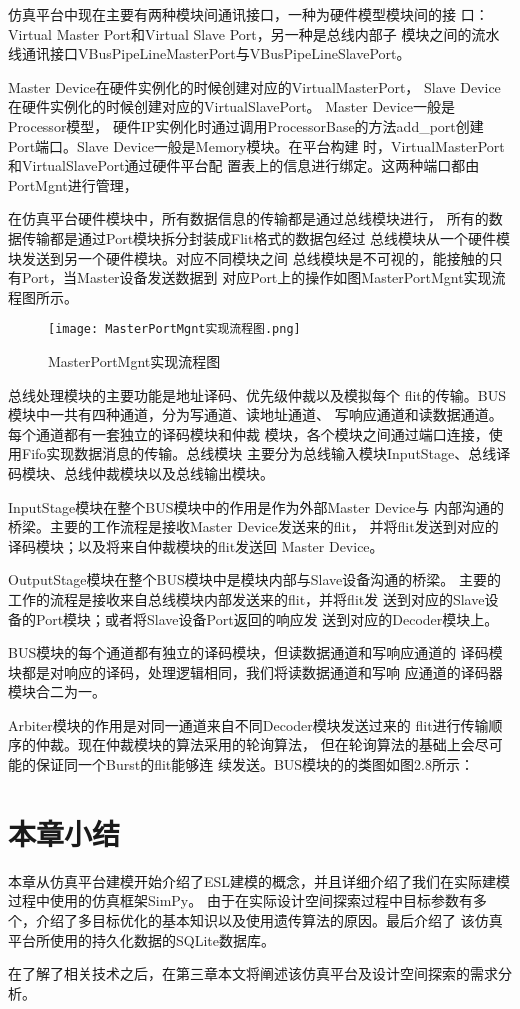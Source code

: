 仿真平台中现在主要有两种模块间通讯接口，一种为硬件模型模块间的接
口：Virtual Master Port和Virtual Slave Port，另一种是总线内部子
模块之间的流水线通讯接口VBusPipeLineMasterPort与VBusPipeLineSlavePort。

Master Device在硬件实例化的时候创建对应的VirtualMasterPort，
Slave Device在硬件实例化的时候创建对应的VirtualSlavePort。
Master Device一般是Processor模型，
硬件IP实例化时通过调用ProcessorBase的方法add\_port创建
Port端口。Slave Device一般是Memory模块。在平台构建
时，VirtualMasterPort和VirtualSlavePort通过硬件平台配
置表上的信息进行绑定。这两种端口都由PortMgnt进行管理，

在仿真平台硬件模块中，所有数据信息的传输都是通过总线模块进行，
所有的数据传输都是通过Port模块拆分封装成Flit格式的数据包经过
总线模块从一个硬件模块发送到另一个硬件模块。对应不同模块之间
总线模块是不可视的，能接触的只有Port，当Master设备发送数据到
对应Port上的操作如图MasterPortMgnt实现流程图所示。

\begin{figure}
  \centering
  \texttt{[image: MasterPortMgnt实现流程图.png]}
  \caption{MasterPortMgnt实现流程图}
  \label{fig:badge}
\end{figure}

总线处理模块的主要功能是地址译码、优先级仲裁以及模拟每个
flit的传输。BUS模块中一共有四种通道，分为写通道、读地址通道、
写响应通道和读数据通道。每个通道都有一套独立的译码模块和仲裁
模块，各个模块之间通过端口连接，使用Fifo实现数据消息的传输。总线模块
主要分为总线输入模块InputStage、总线译码模块、总线仲裁模块以及总线输出模块。

InputStage模块在整个BUS模块中的作用是作为外部Master Device与
内部沟通的桥梁。主要的工作流程是接收Master Device发送来的flit，
并将flit发送到对应的译码模块；以及将来自仲裁模块的flit发送回
Master Device。

OutputStage模块在整个BUS模块中是模块内部与Slave设备沟通的桥梁。
主要的工作的流程是接收来自总线模块内部发送来的flit，并将flit发
送到对应的Slave设备的Port模块；或者将Slave设备Port返回的响应发
送到对应的Decoder模块上。

BUS模块的每个通道都有独立的译码模块，但读数据通道和写响应通道的
译码模块都是对响应的译码，处理逻辑相同，我们将读数据通道和写响
应通道的译码器模块合二为一。

Arbiter模块的作用是对同一通道来自不同Decoder模块发送过来的
flit进行传输顺序的仲裁。现在仲裁模块的算法采用的轮询算法，
但在轮询算法的基础上会尽可能的保证同一个Burst的flit能够连
续发送。BUS模块的的类图如图2.8所示：

  \section{本章小结}
  本章从仿真平台建模开始介绍了ESL建模的概念，并且详细介绍了我们在实际建模过程中使用的仿真框架SimPy。
  由于在实际设计空间探索过程中目标参数有多个，介绍了多目标优化的基本知识以及使用遗传算法的原因。最后介绍了
  该仿真平台所使用的持久化数据的SQLite数据库。

  在了解了相关技术之后，在第三章本文将阐述该仿真平台及设计空间探索的需求分析。


  

